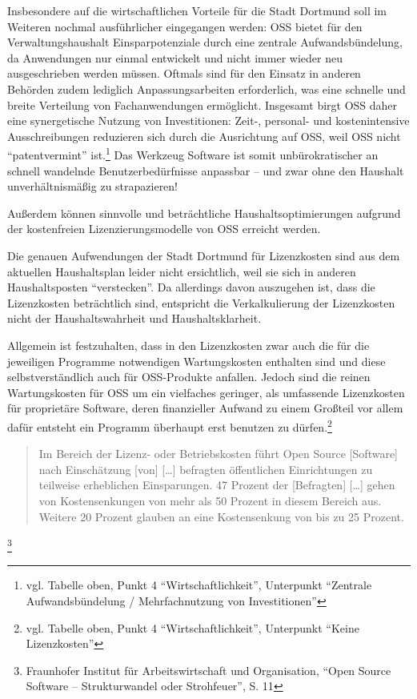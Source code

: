 \documentclass[a4paper]{scrartcl}
\begin{document}
Insbesondere auf die wirtschaftlichen Vorteile für die Stadt Dortmund soll im
Weiteren nochmal ausführlicher eingegangen werden: OSS bietet für den
Verwaltungshaushalt Einsparpotenziale durch eine zentrale Aufwandsbündelung, da
Anwendungen nur einmal entwickelt und nicht immer wieder neu ausgeschrieben
werden müssen. Oftmals sind für den Einsatz in anderen Behörden zudem lediglich
Anpassungsarbeiten erforderlich, was eine schnelle und breite Verteilung von
Fachanwendungen ermöglicht. Insgesamt birgt OSS daher eine synergetische Nutzung
von Investitionen: Zeit-, personal- und kostenintensive Ausschreibungen
reduzieren sich durch die Ausrichtung auf OSS, weil OSS nicht ``patentvermint''
ist.\footnote{vgl.  Tabelle oben, Punkt 4 ``Wirtschaftlichkeit'', Unterpunkt
  ``Zentrale Aufwandsbündelung / Mehrfachnutzung von Investitionen''} Das
Werkzeug Software ist somit unbürokratischer an schnell wandelnde
Benutzerbedürfnisse anpassbar -- und zwar ohne den Haushalt unverhältnismäßig zu
strapazieren!

Außerdem können sinnvolle und beträchtliche Haushaltsoptimierungen aufgrund der
kostenfreien Lizenzierungsmodelle von OSS erreicht werden.

Die genauen Aufwendungen der Stadt Dortmund für Lizenzkosten sind aus dem
aktuellen Haushaltsplan leider nicht ersichtlich, weil sie sich in anderen
Haushaltsposten ``verstecken''.  Da allerdings davon auszugehen ist, dass die
Lizenzkosten beträchtlich sind, entspricht die Verkalkulierung der Lizenzkosten
nicht der Haushaltswahrheit und Haushaltsklarheit.

Allgemein ist festzuhalten, dass in den Lizenzkosten zwar auch die für die
jeweiligen Programme notwendigen Wartungskosten enthalten sind und diese
selbstverständlich auch für OSS-Produkte anfallen. Jedoch sind die reinen
Wartungskosten für OSS um ein vielfaches geringer, als umfassende Lizenzkosten
für proprietäre Software, deren finanzieller Aufwand zu einem Großteil vor allem
dafür entsteht ein Programm überhaupt erst benutzen zu dürfen.\footnote{vgl.
  Tabelle oben, Punkt 4 ``Wirtschaftlichkeit'', Unterpunkt ``Keine
  Lizenzkosten''}

\begin{quote}Im Bereich der Lizenz- oder Betriebskosten führt Open Source
  [Software] nach Einschätzung [von] [{\dots}] befragten öffentlichen
  Einrichtungen zu teilweise erheblichen Einsparungen. 47 Prozent der
  [Befragten] [\ldots] gehen von Kostensenkungen von mehr als 50 Prozent in
  diesem Bereich aus. Weitere 20 Prozent glauben an eine Kostensenkung von bis
  zu 25 Prozent.
\end{quote}\footnote{Fraunhofer Institut für Arbeitswirtschaft und Organisation,
  ``Open Source Software -- Strukturwandel oder Strohfeuer'', S. 11}
\end{document}

